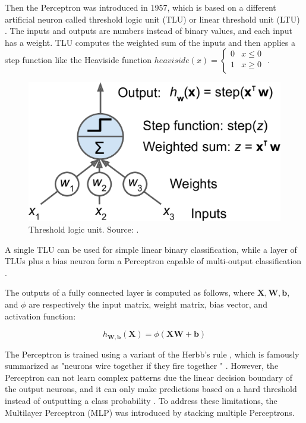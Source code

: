 \documentclass[a4paper,11pt,oneside]{article}
\begin{document}
  Then the Perceptron was introduced in 1957, which is based on a different artificial neuron called threshold logic unit
  (TLU) or linear threshold unit (LTU) \cite{rosenblatt1957perceptron}. The inputs and outputs are numbers instead of
  binary values, and each input has a weight. TLU computes the weighted sum of the inputs and then applies a step
  function like the Heaviside function
  $heaviside (x) =
  \begin{cases}
    0 & x \le 0 \\
    1 & x \geq 0 \\
  \end{cases}$
  \cite{geron2019hands, rosenblatt1957perceptron}.

  \begin{figure}[ht]
    \begin{center}
      \includegraphics[width=.8\textwidth]{tlu.png}
    \end{center}
    \caption{Threshold logic unit. Source: \cite{geron2019hands}.}
  \end{figure}

  A single TLU can be used for simple linear binary classification, while a layer of TLUs plus a bias neuron form a
  Perceptron capable of multi-output classification \cite{geron2019hands}.

  The outputs of a fully connected layer is computed as follows, where $\mathbf{X}, \mathbf{W}, \mathbf{b}$, and $\phi$
  are respectively the input matrix, weight matrix, bias vector, and activation function:

  $$h_{\mathbf{W,b}}(\mathbf{X}) = \phi(\mathbf{XW} + \mathbf{b})$$

  The Perceptron is trained using a variant of the Herbb's rule \cite{hebb2005organization}, which is famously summarized
  as "neurons wire together if they fire together \cite{lowel1992selection}" \cite{geron2019hands}. However, the Perceptron
  can not learn complex patterns due the linear decision boundary of the output neurons, and it can only make predictions
  based on a hard threshold instead of outputting a class probability \cite{geron2019hands}. To address these limitations,
  the Multilayer Perceptron (MLP) was introduced by stacking multiple Perceptrons.
\end{document}
